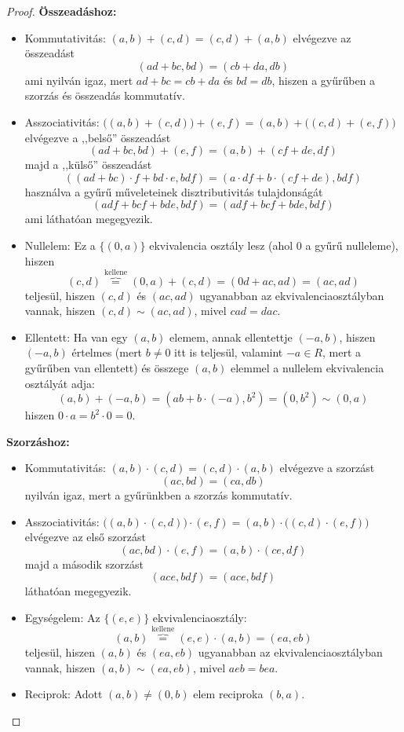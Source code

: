 \documentclass[12pt]{book}
\theoremstyle{plain} %
\theoremstyle{definition} %
\theoremstyle{remark}
\numberwithin{equation}{section}  %
\begin{document}
\begin{proof}
		\textbf{Összeadáshoz:}
		\begin{itemize}
			\item{Kommutativitás: $(a,b)+(c,d) = (c,d) + (a,b)$
				elvégezve az összeadást
				\[ (ad+bc,bd) = (cb+da,db)  \]
				ami nyilván igaz, mert $ad+bc=cb+da$ és $bd=db$, hiszen a gyűrűben a szorzás és összeadás kommutatív.
			}
			\item{Asszociativitás: $\Big((a,b)+(c,d)\Big) + (e,f) = (a,b) + \Big((c,d) + (e,f)\Big)$
				elvégezve a ,,belső'' összeadást
				\[ (ad+bc,bd) + (e,f) = (a,b) + (cf+de,df)  \]
				majd a ,,külső'' összeadást
				\[ ((ad+bc)\cdot f + bd\cdot e,bdf) = (a\cdot df + b\cdot (cf+de),bdf)  \]
				használva a gyűrű műveleteinek disztributivitás tulajdonságát
				\[ (adf+bcf+bde,bdf) = (adf+bcf+bde,bdf)  \]
				ami láthatóan megegyezik.
			}
			\item{Nullelem: Ez a $\{(0,a)\}$ ekvivalencia osztály lesz (ahol $0$ a gyűrű nulleleme), hiszen
				\[ (c,d) \overbrace{=}^{\text{kellene}} (0,a) + (c,d) = (0d+ac,ad) = (ac,ad)  \]
				teljesül, hiszen $(c,d)$ és $(ac,ad)$ ugyanabban az ekvivalenciaosztályban vannak, hiszen $(c,d)\sim (ac,ad)$, mivel $cad = dac$.
			}
			\item{Ellentett: Ha van egy $(a,b)$ elemem, annak ellentettje $(-a,b)$,
				hiszen $(-a,b)$ értelmes (mert $b\neq 0$ itt is teljesül, valamint $-a\in R$, mert a gyűrűben van ellentett) és összege $(a,b)$ elemmel a nullelem ekvivalencia osztályát adja:
				\[ (a,b)+(-a,b) = (ab+b\cdot(-a), b^2 ) = (0,b^2) \sim (0,a)  \]
				hiszen $0\cdot a = b^2 \cdot 0 = 0$.
			}
		\end{itemize}
		
		\textbf{Szorzáshoz:}
		\begin{itemize}
			\item{Kommutativitás: $(a,b)\cdot (c,d) = (c,d) \cdot (a,b)$
				elvégezve a szorzást
				\[ (ac,bd) = (ca,db)  \]
				nyilván igaz, mert a gyűrünkben a szorzás kommutatív.
			}
			\item{Asszociativitás: $\Big((a,b)\cdot (c,d)\Big) \cdot (e,f) = (a,b) \cdot \Big((c,d) \cdot (e,f)\Big)$
				elvégezve az első szorzást
				\[ (ac,bd)\cdot (e,f) = (a,b)\cdot (ce,df)  \]
				majd a második szorzást
				\[ (ace,bdf) = (ace,bdf)  \]
				láthatóan megegyezik.
			}
			\item{Egységelem: Az $\{ (e,e) \}$ ekvivalenciaosztály:
				\[ (a,b) \overbrace{=}^{\text{kellene}} (e,e)\cdot (a,b) = (ea,eb)  \]
				teljesül, hiszen $(a,b)$ és $(ea,eb)$ ugyanabban az ekvivalenciaosztályban vannak, hiszen $(a,b)\sim (ea,eb)$, mivel $aeb = bea$.
			}
			\item{Reciprok: Adott $(a,b)\neq (0,b)$ elem reciproka $(b,a)$.
			
}
\end{itemize}
\end{proof}
\end{document}
